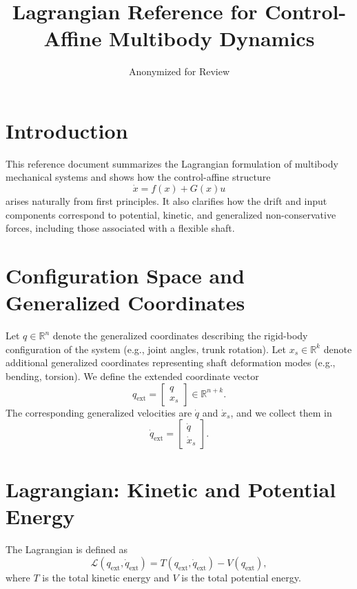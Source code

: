 \documentclass[12pt]{article}
\title{Lagrangian Reference for Control-Affine Multibody Dynamics}
\author{Anonymized for Review}
\date{}
\begin{document}
\maketitle

\section{Introduction}

This reference document summarizes the Lagrangian formulation of multibody mechanical systems and shows how the control-affine structure
\begin{equation}
\dot{x} = f(x) + G(x)u
\end{equation}
arises naturally from first principles. It also clarifies how the drift and input components correspond to potential, kinetic, and generalized non-conservative forces, including those associated with a flexible shaft.

\section{Configuration Space and Generalized Coordinates}

Let $q \in \mathbb{R}^n$ denote the generalized coordinates describing the rigid-body configuration of the system (e.g., joint angles, trunk rotation).
Let $x_s \in \mathbb{R}^k$ denote additional generalized coordinates representing shaft deformation modes (e.g., bending, torsion).
We define the extended coordinate vector
\begin{equation}
q_{\mathrm{ext}} = \begin{bmatrix} q \\ x_s \end{bmatrix} \in \mathbb{R}^{n+k}.
\end{equation}
The corresponding generalized velocities are $\dot{q}$ and $\dot{x}_s$, and we collect them in
\begin{equation}
\dot{q}_{\mathrm{ext}} = \begin{bmatrix} \dot{q} \\ \dot{x}_s \end{bmatrix}.
\end{equation}

\section{Lagrangian: Kinetic and Potential Energy}

The Lagrangian is defined as
\begin{equation}
\mathcal{L}(q_{\mathrm{ext}},\dot{q}_{\mathrm{ext}}) = T(q_{\mathrm{ext}},\dot{q}_{\mathrm{ext}}) - V(q_{\mathrm{ext}}),
\end{equation}
where $T$ is the total kinetic energy and $V$ is the total potential energy.
\end{document}
